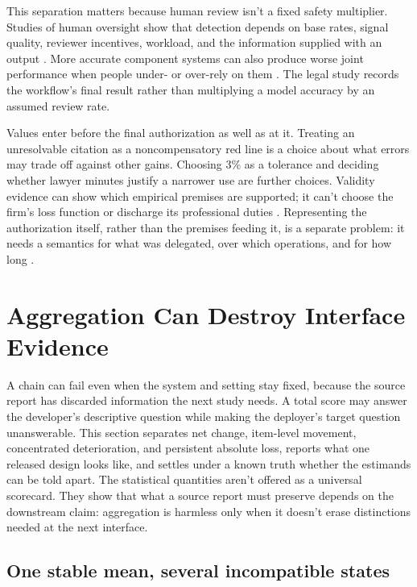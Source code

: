 \documentclass[12pt]{article}
\newif\ifanon
\begin{document}
This separation matters because human review isn't a fixed safety multiplier. Studies of human oversight show that detection depends on base rates, signal quality, reviewer incentives, workload, and the information supplied with an output \citep{langer2025oversight}. More accurate component systems can also produce worse joint performance when people under- or over-rely on them \citep{buijsman2026accuracy}. The legal study records the workflow's final result rather than multiplying a model accuracy by an assumed review rate.

Values enter before the final authorization as well as at it. Treating an unresolvable citation as a noncompensatory red line is a choice about what errors may trade off against other gains. Choosing 3\% as a tolerance and deciding whether lawyer minutes justify a narrower use are further choices. Validity evidence can show which empirical premises are supported; it can't choose the firm's loss function or discharge its professional duties \citep[747--749]{messick1995Validity}. Representing the authorization itself, rather than the premises feeding it, is a separate problem: it needs a semantics for what was delegated, over which operations, and for how long \ifanon\citep{anonSelfDelegationAssurance}\else\citep{reynolds2026delegationassurance}\fi.

\section{Aggregation Can Destroy Interface Evidence}\label{sec:aggregation}

A chain can fail even when the system and setting stay fixed, because the source report has discarded information the next study needs. A total score may answer the developer's descriptive question while making the deployer's target question unanswerable. This section separates net change, item-level movement, concentrated deterioration, and persistent absolute loss, reports what one released design looks like, and settles under a known truth whether the estimands can be told apart. The statistical quantities aren't offered as a universal scorecard. They show that what a source report must preserve depends on the downstream claim: aggregation is harmless only when it doesn't erase distinctions needed at the next interface.

\subsection{One stable mean, several incompatible states}\label{ssec:aggregate_logic}
\end{document}
